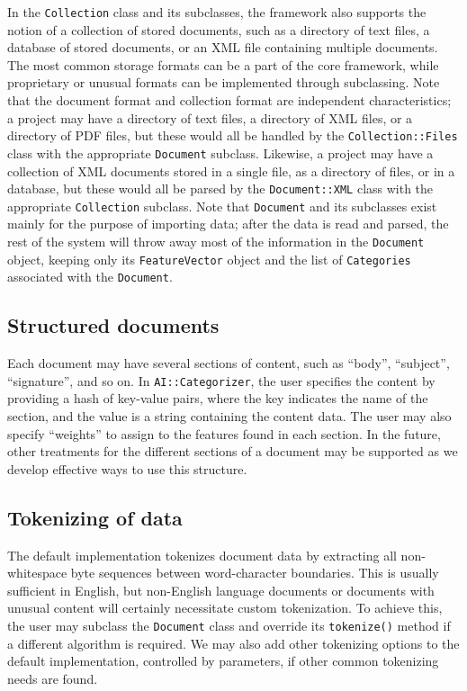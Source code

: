 \documentclass[twocolumn]{article}
\newcommand{\method}[1]{\texttt{#1()}}
\newcommand{\class}[1]{\texttt{#1}}
\newcommand{\aicat}{\texttt{AI::Cat\-e\-gor\-i\-zer}}
\begin{document}
In the \class{Collection} class and its subclasses, the framework
also supports the notion of a collection of stored documents, such as
a directory of text files, a database of stored documents, or an XML
file containing multiple documents.  The most common storage formats
can be a part of the core framework, while proprietary or unusual
formats can be implemented through subclassing.  Note that the
document format and collection format are independent characteristics;
a project may have a directory of text files, a directory of XML
files, or a directory of PDF files, but these would all be handled by
the \class{Collection::Files} class with the appropriate
\class{Document} subclass.  Likewise, a project may have a collection
of XML documents stored in a single file, as a directory of files, or
in a database, but these would all be parsed by the
\class{Document::XML} class with the appropriate \class{Collection}
subclass. Note that \class{Document} and its subclasses exist mainly for
the purpose of importing data; after the data is read and parsed, the
rest of the system will throw away most of the information in the \class{Document} object,
keeping only its \class{FeatureVector} object and the list of
\class{Categories} associated with the \class{Document}.

\subsection*{Structured documents}
Each document may have several sections of content, such as ``body'',
``subject'', ``signature'', and so on.  In \aicat,
the user specifies the content by providing a hash of key-value pairs,
where the key indicates the name of the section, and the value is a
string containing the content data.  The user may also specify
``weights'' to assign to the features found in each section.  In the
future, other treatments for the different sections of a document may
be supported as we develop effective ways to use
this structure.


\subsection*{Tokenizing of data}
The default implementation tokenizes document data by extracting 
all non-whitespace byte sequences between word-character 
boundaries.  This is usually sufficient in English,
but non-English language documents or documents with unusual content
will certainly necessitate custom tokenization.  To achieve this, the
user may subclass the \class{Document} class and override its
\method{tokenize} method if a different algorithm is required.  We
may also add other tokenizing options to the default implementation,
controlled by parameters, if other common tokenizing needs are found.
\end{document}
